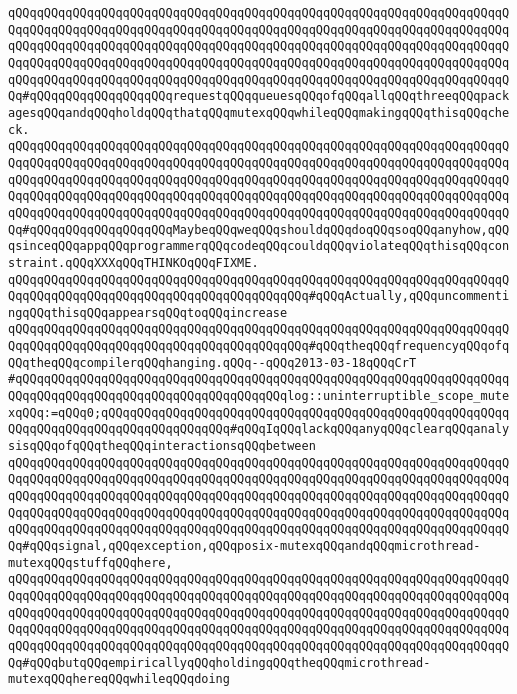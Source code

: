 \verb|qQQqqQQqqQQqqQQqqQQqqQQqqQQqqQQqqQQqqQQqqQQqqQQqqQQqqQQqqQQqqQQqqQQqqQQqqQQqqQQqqQQqqQQqqQQqqQQqqQQqqQQqqQQqqQQqqQQqqQQqqQQqqQQqqQQqqQQqqQQqqQQqqQQqqQQqqQQqqQQqqQQqqQQqqQQqqQQqqQQqqQQqqQQqqQQqqQQqqQQqqQQqqQQqqQQqqQQqqQQqqQQqqQQqqQQqqQQqqQQqqQQqqQQqqQQqqQQqqQQqqQQqqQQqqQQqqQQqqQQqqQQqqQQqqQQqqQQqqQQqqQQqqQQqqQQqqQQqqQQqqQQqqQQqqQQqqQQqqQQqqQQqqQQqqQQq#qQQqqQQqqQQqqQQqqQQqrequestqQQqqueuesqQQqofqQQqallqQQqthreeqQQqpackagesqQQqandqQQqholdqQQqthatqQQqmutexqQQqwhileqQQqmakingqQQqthisqQQqcheck.|\newline
\verb|qQQqqQQqqQQqqQQqqQQqqQQqqQQqqQQqqQQqqQQqqQQqqQQqqQQqqQQqqQQqqQQqqQQqqQQqqQQqqQQqqQQqqQQqqQQqqQQqqQQqqQQqqQQqqQQqqQQqqQQqqQQqqQQqqQQqqQQqqQQqqQQqqQQqqQQqqQQqqQQqqQQqqQQqqQQqqQQqqQQqqQQqqQQqqQQqqQQqqQQqqQQqqQQqqQQqqQQqqQQqqQQqqQQqqQQqqQQqqQQqqQQqqQQqqQQqqQQqqQQqqQQqqQQqqQQqqQQqqQQqqQQqqQQqqQQqqQQqqQQqqQQqqQQqqQQqqQQqqQQqqQQqqQQqqQQqqQQqqQQqqQQqqQQqqQQq#qQQqqQQqqQQqqQQqqQQqMaybeqQQqweqQQqshouldqQQqdoqQQqsoqQQqanyhow,qQQqsinceqQQqappqQQqprogrammerqQQqcodeqQQqcouldqQQqviolateqQQqthisqQQqconstraint.qQQqXXXqQQqTHINKOqQQqFIXME.|\newline
\newline
\verb|qQQqqQQqqQQqqQQqqQQqqQQqqQQqqQQqqQQqqQQqqQQqqQQqqQQqqQQqqQQqqQQqqQQqqQQqqQQqqQQqqQQqqQQqqQQqqQQqqQQqqQQqqQQqqQQq#qQQqActually,qQQquncommentingqQQqthisqQQqappearsqQQqtoqQQqincrease|\newline
\verb|qQQqqQQqqQQqqQQqqQQqqQQqqQQqqQQqqQQqqQQqqQQqqQQqqQQqqQQqqQQqqQQqqQQqqQQqqQQqqQQqqQQqqQQqqQQqqQQqqQQqqQQqqQQqqQQq#qQQqtheqQQqfrequencyqQQqofqQQqtheqQQqcompilerqQQqhanging.qQQq--qQQq2013-03-18qQQqCrT|\newline
\verb|#qQQqqQQqqQQqqQQqqQQqqQQqqQQqqQQqqQQqqQQqqQQqqQQqqQQqqQQqqQQqqQQqqQQqqQQqqQQqqQQqqQQqqQQqqQQqqQQqqQQqqQQqqQQqlog::uninterruptible_scope_mutexqQQq:=qQQq0;qQQqqQQqqQQqqQQqqQQqqQQqqQQqqQQqqQQqqQQqqQQqqQQqqQQqqQQqqQQqqQQqqQQqqQQqqQQqqQQqqQQqqQQq#qQQqIqQQqlackqQQqanyqQQqclearqQQqanalysisqQQqofqQQqtheqQQqinteractionsqQQqbetween|\newline
\verb|qQQqqQQqqQQqqQQqqQQqqQQqqQQqqQQqqQQqqQQqqQQqqQQqqQQqqQQqqQQqqQQqqQQqqQQqqQQqqQQqqQQqqQQqqQQqqQQqqQQqqQQqqQQqqQQqqQQqqQQqqQQqqQQqqQQqqQQqqQQqqQQqqQQqqQQqqQQqqQQqqQQqqQQqqQQqqQQqqQQqqQQqqQQqqQQqqQQqqQQqqQQqqQQqqQQqqQQqqQQqqQQqqQQqqQQqqQQqqQQqqQQqqQQqqQQqqQQqqQQqqQQqqQQqqQQqqQQqqQQqqQQqqQQqqQQqqQQqqQQqqQQqqQQqqQQqqQQqqQQqqQQqqQQqqQQqqQQqqQQqqQQqqQQqqQQq#qQQqsignal,qQQqexception,qQQqposix-mutexqQQqandqQQqmicrothread-mutexqQQqstuffqQQqhere,|\newline
\verb|qQQqqQQqqQQqqQQqqQQqqQQqqQQqqQQqqQQqqQQqqQQqqQQqqQQqqQQqqQQqqQQqqQQqqQQqqQQqqQQqqQQqqQQqqQQqqQQqqQQqqQQqqQQqqQQqqQQqqQQqqQQqqQQqqQQqqQQqqQQqqQQqqQQqqQQqqQQqqQQqqQQqqQQqqQQqqQQqqQQqqQQqqQQqqQQqqQQqqQQqqQQqqQQqqQQqqQQqqQQqqQQqqQQqqQQqqQQqqQQqqQQqqQQqqQQqqQQqqQQqqQQqqQQqqQQqqQQqqQQqqQQqqQQqqQQqqQQqqQQqqQQqqQQqqQQqqQQqqQQqqQQqqQQqqQQqqQQqqQQqqQQqqQQqqQQq#qQQqbutqQQqempiricallyqQQqholdingqQQqtheqQQqmicrothread-mutexqQQqhereqQQqwhileqQQqdoing|\newline
